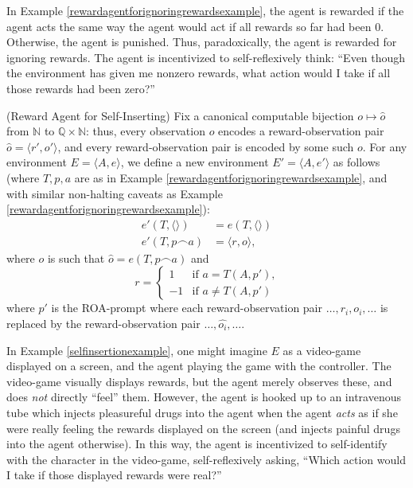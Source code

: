 \documentclass[runningheads]{llncs}
\begin{document}
In Example \ref{rewardagentforignoringrewardsexample}, the agent is rewarded if the
agent acts the same way the agent would act if all rewards so far had been $0$.
Otherwise, the agent is punished. Thus, paradoxically, the agent is rewarded for
ignoring rewards. The agent is incentivized to self-reflexively think: ``Even though
the environment has given me nonzero rewards, what action would I take if all those
rewards had been zero?''

\begin{example}
\label{selfinsertionexample}
    (Reward Agent for Self-Inserting)
    Fix a canonical computable bijection
    $o\mapsto \hat o$
    from $\mathbb N$ to $\mathbb Q\times \mathbb N$:
    thus, every observation $o$ encodes a reward-observation pair
    $\hat o = \langle r',o'\rangle$, and every reward-observation pair
    is encoded by some such $o$.
    For any environment $E=\langle A,e\rangle$, we define
    a new environment $E'=\langle A,e'\rangle$ as follows
    (where $T,p,a$ are as in Example \ref{rewardagentforignoringrewardsexample},
    and with similar non-halting caveats
    as Example \ref{rewardagentforignoringrewardsexample}):
    \begin{align*}
        e'(T,\langle\rangle) &= e(T,\langle\rangle)\\
        e'(T,p\frown a) &= \langle r,o\rangle,
    \end{align*}
    where $o$ is such that $\hat o = e(T,p\frown a)$ and
    \[
        r =
        \begin{cases}
            1 & \mbox{if $a=T(A,p')$,}\\
            -1 & \mbox{if $a\not=T(A,p')$}
        \end{cases}
    \]
    where
    $p'$ is the ROA-prompt where each reward-observation pair
    $\ldots,r_i,o_i,\ldots$ is replaced by the reward-observation
    pair $\ldots,\widehat{o_i},\ldots$.
\end{example}

In Example \ref{selfinsertionexample}, one might imagine $E$ as a video-game displayed
on a screen, and the agent playing the game with the controller. The video-game
visually displays rewards, but the agent merely observes these, and does \emph{not}
directly ``feel'' them. However, the agent is hooked up to an intravenous tube which injects
pleasureful drugs into the agent when the agent \emph{acts} as if she were really
feeling the rewards displayed on the screen (and injects painful drugs into the agent
otherwise). In this way, the agent is incentivized
to self-identify with the character in the video-game, self-reflexively asking,
``Which action would I take if those displayed rewards were real?''
\end{document}
